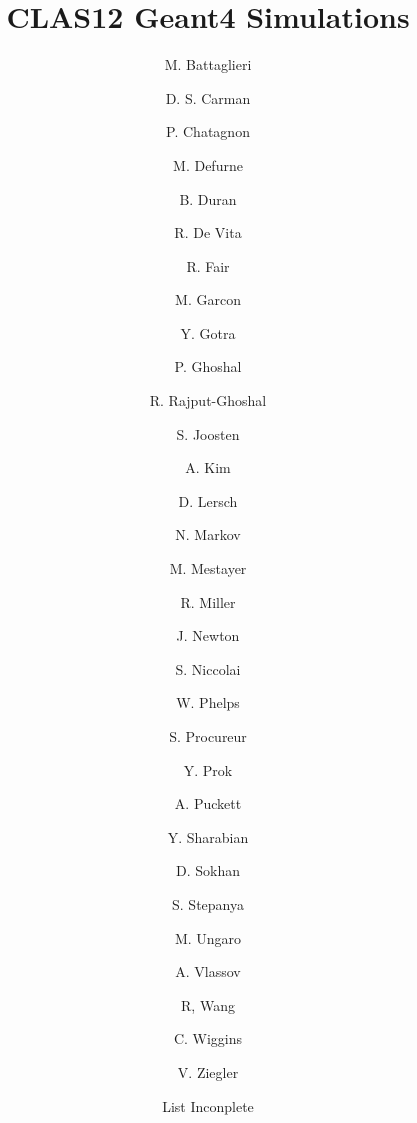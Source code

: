 \title{CLAS12 Geant4 Simulations}




\author[B]{M. Battaglieri}
\author[A]{D. S. Carman}
\author[E]{P. Chatagnon}
\author[C]{M. Defurne}
\author[K]{B. Duran}
\author[B]{R. De Vita}
\author[A]{R. Fair}
\author[C]{M. Garcon}
\author[A]{Y. Gotra}
\author[A]{P. Ghoshal}
\author[A]{R. Rajput-Ghoshal}
\author[K]{S. Joosten}
\author[D]{A. Kim}
\author[J]{D. Lersch}
\author[D]{N. Markov}
\author[A]{M. Mestayer}
\author[A]{R. Miller}
\author[H]{J. Newton}
\author[E]{S. Niccolai}
\author[L]{W. Phelps}
\author[C]{S. Procureur}
\author[H, I]{Y. Prok}
\author[D]{A. Puckett}
\author[A]{Y. Sharabian}
\author[F]{D. Sokhan}
\author[A]{S. Stepanya}
\author[A]{M. Ungaro}
\author[G]{A. Vlassov}
\author[E]{R, Wang}
\author[A]{C. Wiggins}
\author[A]{V. Ziegler}
\author[A]{List Inconplete}

\address[A]{Thomas Jefferson National Accelerator Facility, Newport News, VA, USA}
\address[B]{Istituto Nazionale Di Fisica Nucleare, Genova, Italy}
\address[C]{IRFU, CEA, Universit\`e Paris-Saclay, F-91191 Gif-sur-Yvette, France}
\address[D]{University of Connecticut, Storrs, Connecticut}
\address[E]{Institut de Physique Nuclaire, CNRS-IN2P3, Univ. Paris-Sud, Universit Paris-Saclay, 91406 Orsay Cedex, France}
\address[F]{University of Glasgow, Glasgow G12 8QQ, United Kingdom }
\address[G]{Institute For Theoretical and Experimental Physics, Moscow, Russia}
\address[H]{Old Dominion University, Norfolk, VA, USA}
\address[I]{Virginia Commonwealth University, Richmond, VA, USA}
\address[J]{Florida State University, Tallahassee, FL, USA}
\address[K]{Temple University, Philadelphia, PA, USA}
\address[L]{George Washington University, Washington, DC, USA}
